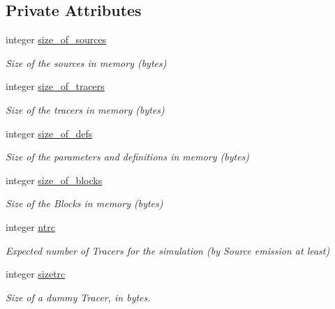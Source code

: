 \subsection*{Private Attributes}
\begin{DoxyCompactItemize}
\item 
integer \mbox{\hyperlink{structsimulationmemory__mod_1_1memory__t_af6321367f42a24e0331c2e1da01f1367}{size\+\_\+of\+\_\+sources}}
\begin{DoxyCompactList}\small\item\em Size of the sources in memory (bytes) \end{DoxyCompactList}\item 
integer \mbox{\hyperlink{structsimulationmemory__mod_1_1memory__t_ab0bafedbc072d99c7f8daf4f52cc1a29}{size\+\_\+of\+\_\+tracers}}
\begin{DoxyCompactList}\small\item\em Size of the tracers in memory (bytes) \end{DoxyCompactList}\item 
integer \mbox{\hyperlink{structsimulationmemory__mod_1_1memory__t_ad73dd51ffc77c775c18706b4324db517}{size\+\_\+of\+\_\+defs}}
\begin{DoxyCompactList}\small\item\em Size of the parameters and definitions in memory (bytes) \end{DoxyCompactList}\item 
integer \mbox{\hyperlink{structsimulationmemory__mod_1_1memory__t_a12fbf3e8bb3b00b8ea7d69bd8c16c582}{size\+\_\+of\+\_\+blocks}}
\begin{DoxyCompactList}\small\item\em Size of the Blocks in memory (bytes) \end{DoxyCompactList}\item 
integer \mbox{\hyperlink{structsimulationmemory__mod_1_1memory__t_a4a8dedbf0302ce774a61b55a1053bd51}{ntrc}}
\begin{DoxyCompactList}\small\item\em Expected number of Tracers for the simulation (by Source emission at least) \end{DoxyCompactList}\item 
integer \mbox{\hyperlink{structsimulationmemory__mod_1_1memory__t_aeb0ed70db36a56115ed196dc4a579d6d}{sizetrc}}
\begin{DoxyCompactList}\small\item\em Size of a dummy Tracer, in bytes. \end{DoxyCompactList}\end{DoxyCompactItemize}


